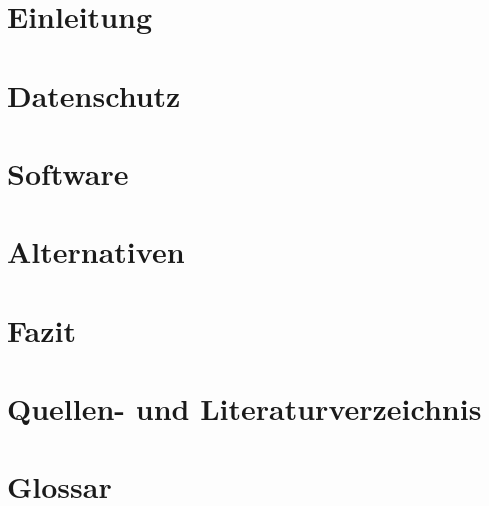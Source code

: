 \documentclass[11pt]{article}
\begin{document}

    
    \newpage
    \tableofcontents
    \newpage
    \section{Einleitung}
    
    \pagebreak
    \section{Datenschutz}
    
    \pagebreak
    \section{Software}
    
    \pagebreak
    \section{Alternativen}
    
    \pagebreak
    \section{Fazit}
    
    \clearpage
    \pagestyle{plain}
    \section{Quellen- und Literaturverzeichnis}
    
    \pagebreak
    \section{Glossar}
    
    \pagebreak
    
\end{document}
